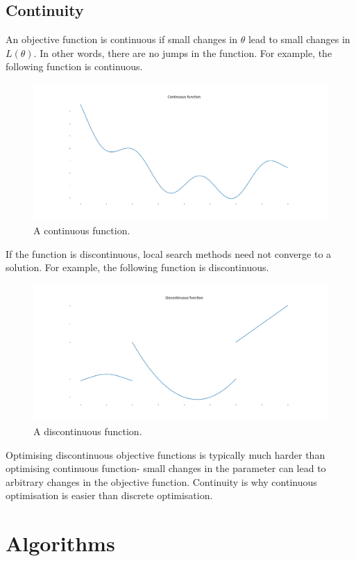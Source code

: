 \documentclass[a4paper, openany]{memoir}
\begin{document}
\subsection{Continuity}
An objective function is continuous if small changes in $\theta$ lead to small changes in $L(\theta)$. In other words, there are no jumps in the function. For example, the following function is continuous.
\begin{figure}[H]
    \centering
    \includegraphics[scale=0.3]{src/4.9 continuous functions.png}
    \caption{A continuous function.}
\end{figure}
\noindent If the function is discontinuous, local search methods need not converge to a solution. For example, the following function is discontinuous.
\begin{figure}[H]
    \centering
    \includegraphics[scale=0.3]{src/4.10 noncontinuous functions.png}
    \caption{A discontinuous function.}
\end{figure}
\noindent Optimising discontinuous objective functions is typically much harder than optimising continuous function- small changes in the parameter can lead to arbitrary changes in the objective function. Continuity is why continuous optimisation is easier than discrete optimisation.
\newpage

\section{Algorithms}
\end{document}
